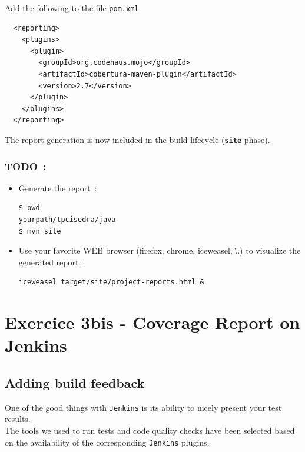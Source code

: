 \documentclass{article}
\begin{document}
Add the following to the file  \texttt{pom.xml}
\begin{lstlisting}
  <reporting>
    <plugins>
      <plugin>
        <groupId>org.codehaus.mojo</groupId>
        <artifactId>cobertura-maven-plugin</artifactId>
        <version>2.7</version>
      </plugin>
    </plugins>
  </reporting>
\end{lstlisting}

The report generation is now included in the build lifecycle (\textbf{\texttt{site}} phase).

\subsubsection{TODO~:}

\begin{itemize}
\item Generate the report~:
\begin{lstlisting}
$ pwd
yourpath/tpcisedra/java
$ mvn site
\end{lstlisting}

\item Use your favorite WEB browser (firefox, chrome, iceweasel, \...) to visualize the generated report~:
\begin{lstlisting}
iceweasel target/site/project-reports.html &
\end{lstlisting}
\end{itemize}

\section{Exercice 3bis - Coverage Report on Jenkins}

\subsection{Adding build feedback}
One of the good things with \texttt{Jenkins} is its ability to nicely present your test results. \\
The tools we used to run tests and code quality checks have been selected based on the availability of the corresponding \texttt{Jenkins} plugins.
\end{document}

